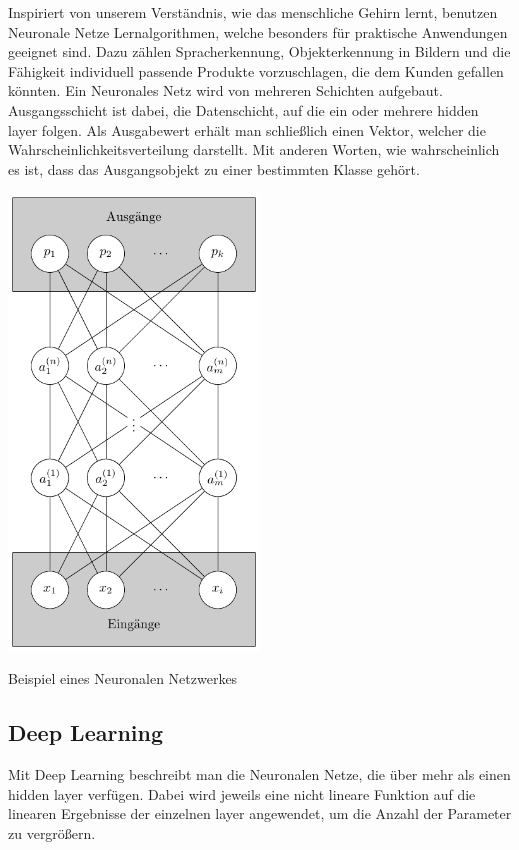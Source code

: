 Inspiriert von unserem Verständnis, wie das menschliche Gehirn lernt, benutzen Neuronale Netze Lernalgorithmen, welche besonders für praktische Anwendungen geeignet sind.
Dazu zählen Spracherkennung, Objekterkennung in Bildern und die Fähigkeit individuell passende Produkte vorzuschlagen, die dem Kunden gefallen könnten. 
Ein Neuronales Netz wird von mehreren Schichten aufgebaut. Ausgangsschicht ist dabei, die Datenschicht, auf die ein oder mehrere hidden layer folgen. Als Ausgabewert erhält man schließlich einen Vektor, welcher die Wahrscheinlichkeitsverteilung darstellt. Mit anderen Worten, wie wahrscheinlich es ist, dass das Ausgangsobjekt zu einer bestimmten Klasse gehört.

\begin{dsafigure}
\begin{center}
	\includegraphics[width=0.5\textwidth]{Figure_NN}
	\caption{Beispiel eines Neuronalen Netzwerkes}
	\label{NN1}
	\end{center}
\end{dsafigure}

\subsection{Deep Learning}

Mit Deep Learning beschreibt man die Neuronalen Netze, die über mehr als einen hidden layer verfügen. Dabei wird jeweils eine nicht lineare Funktion auf die linearen Ergebnisse der einzelnen layer angewendet, um die Anzahl der Parameter zu vergrößern. 

